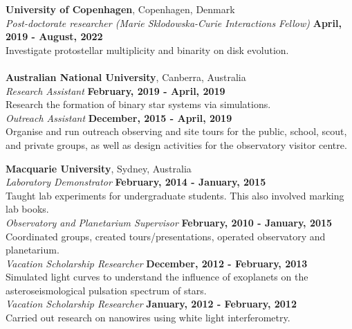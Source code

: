 \documentclass[margin,line]{res}
\begin{document}
\begin{resume}
		{\bf University of Copenhagen}, Copenhagen, Denmark\\
		{\em Post-doctorate researcher (Marie Sklodowska-Curie Interactions Fellow)} \hfill        {\bf April, 2019 - August, 2022}\\
		Investigate protostellar multiplicity and binarity on disk evolution.\\
		\vspace{-1cm}\\
  
		{\bf Australian National University}, Canberra, Australia\\
		{\em Research Assistant} \hfill {\bf February, 2019 - April, 2019}\\
		Research the formation of binary star systems via simulations.\\
		{\em Outreach Assistant} \hfill {\bf December, 2015 - April, 2019}\\
		Organise and run outreach observing and site tours for the public, school, scout, and private groups, as well as design activities for the observatory visitor centre.
		
		{\bf Macquarie University}, Sydney, Australia\\
		{\em Laboratory Demonstrator} \hfill {\bf February, 2014 - January, 2015}\\
		Taught lab experiments for undergraduate students. This also involved marking lab books.\\
		{\em Observatory and Planetarium Supervisor} \hfill {\bf February, 2010 - January, 2015}\\
		Coordinated groups, created tours/presentations, operated observatory and planetarium.\\
		{\em Vacation Scholarship Researcher} \hfill {\bf December, 2012 - February, 2013}\\
		Simulated light curves to understand the influence of exoplanets on the asteroseismological pulsation spectrum of stars.\\
		{\em Vacation Scholarship Researcher} \hfill {\bf January, 2012 - February, 2012}\\
		Carried out research on nanowires using white light interferometry.\\

\vspace*{-0.5cm}
  

\end{resume}
\end{document}
